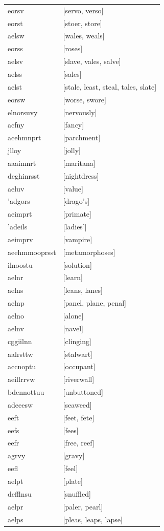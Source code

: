 \documentclass{article}
\begin{document}
\begin{tabular}{ll}
eorsv & [servo, verso] \\
eorst & [stoer, store] \\
aelsw & [wales, weals] \\
eorss & [roses] \\
aelsv & [slave, vales, salve] \\
aelss & [sales] \\
aelst & [stale, least, steal, tales, slate] \\
eorsw & [worse, swore] \\
elnorsuvy & [nervously] \\
acfny & [fancy] \\
acehmnprt & [parchment] \\
jlloy & [jolly] \\
aaaimnrt & [maritana] \\
deghinrsst & [nightdress] \\
aeluv & [value] \\
'adgors & [drago's] \\
aeimprt & [primate] \\
'adeils & [ladies'] \\
aeimprv & [vampire] \\
aeehmmooprsst & [metamorphoses] \\
ilnoostu & [solution] \\
aelnr & [learn] \\
aelns & [leans, lanes] \\
aelnp & [panel, plane, penal] \\
aelno & [alone] \\
aelnv & [navel] \\
cggiilnn & [clinging] \\
aalrsttw & [stalwart] \\
accnoptu & [occupant] \\
aeillrrvw & [riverwall] \\
bdennottuu & [unbuttoned] \\
adeeesw & [seaweed] \\
eeft & [feet, fete] \\
eefs & [fees] \\
eefr & [free, reef] \\
agrvy & [gravy] \\
eefl & [feel] \\
aelpt & [plate] \\
defflnsu & [snuffled] \\
aelpr & [paler, pearl] \\
aelps & [pleas, leaps, lapse] \\

\end{tabular}
\end{document}
